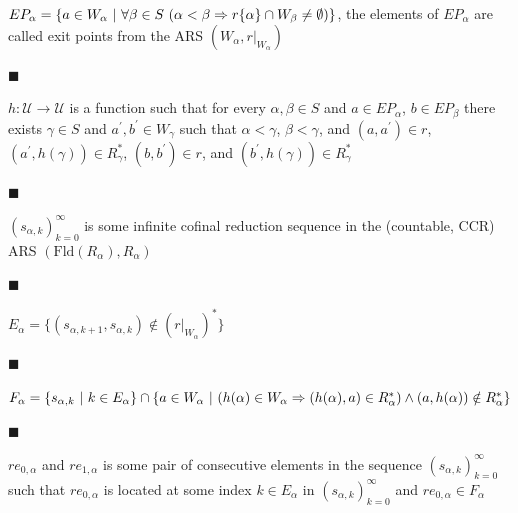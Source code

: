 $EP_{\alpha}=\{a\in W_{\alpha}\leavevmode\nobreak\ |\leavevmode\nobreak\ %
\forall\beta\in S\leavevmode\nobreak\ (\alpha<\beta\Rightarrow r\{\alpha\}\cap
W%
_{\beta}\neq\emptyset)\}$, the elements of $EP_{\alpha}$ are called exit points from the ARS $(W_{\alpha},r|_{W_{\alpha}})$\par
 
 
 
\par\noindent  $\blacksquare$ 
 
$h:\mathcal{U}\to\mathcal{U}$ is a function such that for every $\alpha,\beta\in S$ and $a\in EP_{\alpha}$, $b\in EP_{\beta}$ there exists $\gamma\in S$ and $a^{\prime},b^{\prime}\in W_{\gamma}$ such that $\alpha<\gamma$, $\beta<\gamma$, and $(a,a^{\prime})\in r$, $(a^{\prime},h(\gamma))\in R_{\gamma}^{*}$, $(b,b^{\prime})\in r$, and $(b^{\prime},h(\gamma))\in R_{\gamma}^{*}$\par
 
 
 
\par\noindent  $\blacksquare$ 
 
$(s_{\alpha,k})_{k=0}^{\infty}$ is some infinite cofinal reduction sequence in the (countable, CCR) ARS $(\mathrm{Fld}(R_{\alpha}),R_{\alpha})$\par
 
 
 
\par\noindent  $\blacksquare$ 
 
$E_{\alpha}=\{(s_{\alpha,k+1},s_{\alpha,k})\notin(r|_{W_{\alpha}})^{*}\}$\par
 
 
 
\par\noindent  $\blacksquare$ 
 
$F_{\alpha}=\{s_{\alpha,k}\leavevmode\nobreak\ |\leavevmode\nobreak\ k\in E_{%
\alpha}\}\cap\{a\in W_{\alpha}\leavevmode\nobreak\ |\leavevmode\nobreak\ (h(%
\alpha)\in W_{\alpha}\Rightarrow(h(\alpha),a)\in R_{\alpha}^{*})\wedge(a,h(%
\alpha))\notin R_{\alpha}^{*}\}$\par
 
 
 
\par\noindent  $\blacksquare$ 
 
$re_{0,\alpha}$ and $re_{1,\alpha}$ is some pair of consecutive elements in the sequence $(s_{\alpha,k})_{k=0}^{\infty}$ such that $re_{0,\alpha}$ is located at some index $k\in E_{\alpha}$ in $(s_{\alpha,k})_{k=0}^{\infty}$ and $re_{0,\alpha}\in F_{\alpha}$\par
 
